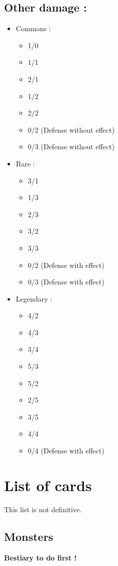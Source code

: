 \documentclass[a4paper,12pt]{book}
\begin{document}
\subsection{Other damage :}
\begin{itemize}
	\item Commons :
	\begin{itemize}
		\item 1/0
		\item 1/1
		\item 2/1
		\item 1/2
		\item 2/2
		\item 0/2 (Defense without effect)
		\item 0/3 (Defense without effect)
	\end{itemize}
	\item Rare :
	\begin{itemize}
		\item 3/1
		\item 1/3
		\item 2/3
		\item 3/2
		\item 3/3
		\item 0/2 (Defense with effect)
		\item 0/3 (Defense with effect)
	\end{itemize}
	\item Legendary :
	\begin{itemize}
		\item 4/2
		\item 4/3
		\item 3/4
		\item 5/3
		\item 5/2
		\item 2/5 
		\item 3/5
		\item 4/4
		\item 0/4 (Defense with effect)
	\end{itemize}
\end{itemize}
\newpage
\section{List of cards}
This list is not definitive.
\subsection{Monsters}
\textbf{Bestiary to do first !}
\end{document}
